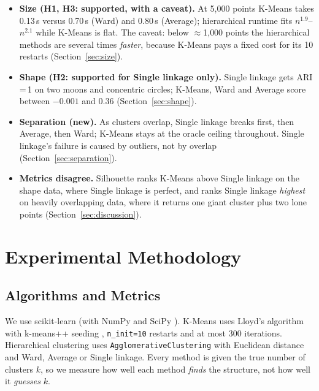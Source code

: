 \documentclass[11pt,letterpaper]{article}
\begin{document}
\begin{itemize}
    \item \textbf{Size (H1, H3: supported, with a caveat).} At 5{,}000 points
    K-Means takes 0.13\,s versus 0.70\,s (Ward) and 0.80\,s (Average);
    hierarchical runtime fits $n^{1.9}$--$n^{2.1}$ while K-Means is flat.
    The caveat: below $\approx$1{,}000 points the hierarchical methods are
    several times \emph{faster}, because K-Means pays a fixed cost for its 10
    restarts (Section~\ref{sec:size}).
    \item \textbf{Shape (H2: supported for Single linkage only).} Single
    linkage gets ARI\,=\,1 on two moons and concentric circles; K-Means, Ward
    and Average score between $-0.001$ and $0.36$ (Section~\ref{sec:shape}).
    \item \textbf{Separation (new).} As clusters overlap, Single linkage breaks
    first, then Average, then Ward; K-Means stays at the oracle ceiling
    throughout. Single linkage's failure is caused by outliers, not by overlap
    (Section~\ref{sec:separation}).
    \item \textbf{Metrics disagree.} Silhouette ranks K-Means above Single
    linkage on the shape data, where Single linkage is perfect, and ranks
    Single linkage \emph{highest} on heavily overlapping data, where it
    returns one giant cluster plus two lone points (Section~\ref{sec:discussion}).
\end{itemize}

\section{Experimental Methodology}

\subsection{Algorithms and Metrics}

We use scikit-learn \cite{pedregosa2011} (with NumPy \cite{harris2020} and
SciPy \cite{virtanen2020}). K-Means uses Lloyd's algorithm with k-means++
seeding \cite{arthur2007}, \texttt{n\_init=10} restarts and at most 300
iterations. Hierarchical clustering uses \texttt{AgglomerativeClustering}
with Euclidean distance and Ward, Average or Single linkage. Every method is
given the true number of clusters $k$, so we measure how well each method
\emph{finds} the structure, not how well it \emph{guesses} $k$.
\end{document}
